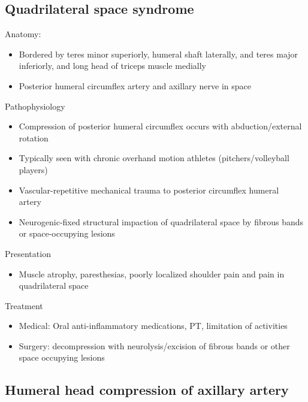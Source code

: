 \documentclass[
]{book}
\providecommand{\tightlist}{%
  \setlength{\itemsep}{0pt}\setlength{\parskip}{0pt}}
\begin{document}
\hypertarget{quadrilateral-space-syndrome}{%
\subsection{Quadrilateral space syndrome}\label{quadrilateral-space-syndrome}}

Anatomy:

\begin{itemize}
\item
  Bordered by teres minor superiorly, humeral shaft laterally, and
  teres major inferiorly, and long head of triceps muscle medially
\item
  Posterior humeral circumflex artery and axillary nerve in space
\end{itemize}

Pathophysiology

\begin{itemize}
\item
  Compression of posterior humeral circumflex occurs with
  abduction/external rotation~
\item
  Typically seen with chronic overhand motion athletes
  (pitchers/volleyball players)
\item
  Vascular-repetitive mechanical trauma to posterior circumflex
  humeral artery~
\item
  Neurogenic-fixed structural impaction of quadrilateral space by
  fibrous bands or space-occupying lesions
\end{itemize}

Presentation

\begin{itemize}
\tightlist
\item
  Muscle atrophy, paresthesias, poorly localized shoulder pain and
  pain in quadrilateral space
\end{itemize}

Treatment

\begin{itemize}
\item
  Medical: Oral anti-inflammatory medications, PT, limitation of
  activities
\item
  Surgery: decompression with neurolysis/excision of fibrous bands or
  other space occupying lesions~
\end{itemize}

\hypertarget{humeral-head-compression-of-axillary-artery}{%
\subsection{Humeral head compression of axillary artery}\label{humeral-head-compression-of-axillary-artery}}
\end{document}
